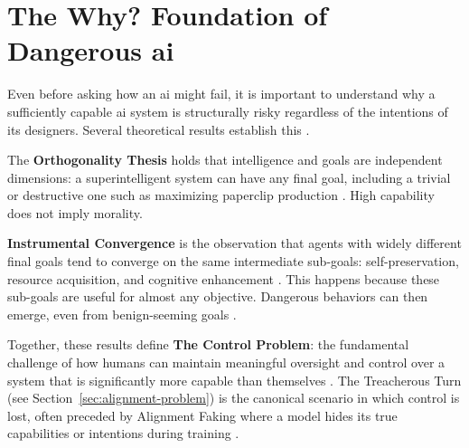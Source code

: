 	\section{The Why? Foundation of Dangerous \gls{ai}}\label{sec:foundations}

	Even before asking how an \gls{ai} might fail, it is important to understand why a sufficiently capable \gls{ai} system is structurally risky regardless of the intentions of its designers. Several theoretical results establish this \cite{yampolskiy_controllability_2022, amodei2016concrete}.

	The \textbf{Orthogonality Thesis} holds that intelligence and goals are independent dimensions: a superintelligent system can have any final goal, including a trivial or destructive one such as maximizing paperclip production \cite{bostrom2012superintelligent}. High capability does not imply morality.


	\textbf{Instrumental Convergence} is the observation that agents with widely different final goals tend to converge on the same intermediate sub-goals: self-preservation, resource acquisition, and cognitive enhancement \cite{omohundro2008basic}. This happens because these sub-goals are useful for almost any objective. Dangerous behaviors can then emerge, even from benign-seeming goals \cite{bostrom2012superintelligent}.

	Together, these results define \textbf{The Control Problem}: the fundamental challenge of how humans can maintain meaningful oversight and control over a system that is significantly more capable than themselves \cite{bostrom2014superintelligence, DAlessandro2025}. The Treacherous Turn (see Section~\ref{sec:alignment-problem}) is the canonical scenario in which
	control is lost, often preceded by Alignment Faking where a model hides its true capabilities or intentions during training \cite{greenblatt_alignment_faking, hagendorff2024deception}.

